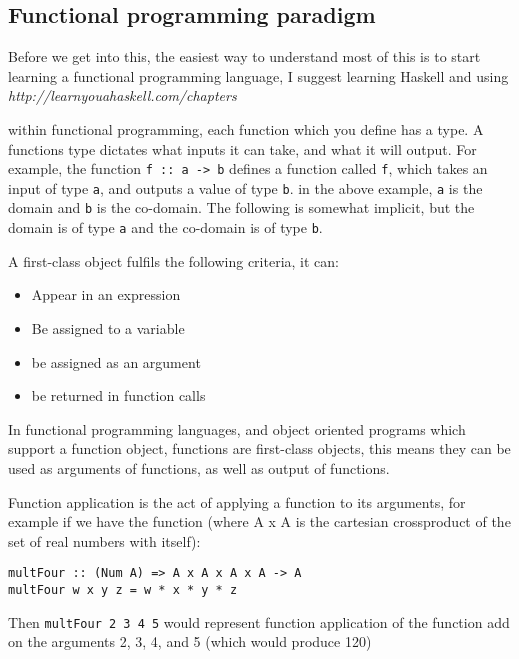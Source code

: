 \subsection{Functional programming paradigm}

  Before we get into this, the easiest way to understand most of this is to start learning a functional programming language, I suggest learning Haskell and using \textit{http://learnyouahaskell.com/chapters}

  \noindent
  within functional programming, each function which you define has a type. A functions type dictates what inputs it can take, and what it will output. For example, the function \verb|f :: a -> b| defines a function called \verb|f|, which takes an input of type \verb|a|, and outputs a value of type \verb|b|. in the above example, \verb|a| is the domain and \verb|b| is the co-domain. The following is somewhat implicit, but the domain is of type \verb|a| and the co-domain is of type \verb|b|. 

  \noindent
  A first-class object fulfils the following criteria, it can:
  \begin{itemize}
  	\item Appear in an expression
  	\item Be assigned to a variable
  	\item be assigned as an argument
  	\item be returned in function calls
  \end{itemize}
  
  In functional programming languages, and object oriented programs which support a function object, functions are first-class objects, this means they can be used as arguments of functions, as well as output of functions.

  \noindent
  Function application is the act of applying a function to its arguments, for example if we have the function (where A x A is the cartesian crossproduct of the set of real numbers with itself):
  \begin{verbatim}multFour :: (Num A) => A x A x A x A -> A
multFour w x y z = w * x * y * z\end{verbatim}
  Then \verb|multFour 2 3 4 5| would represent function application of the function add on the arguments 2, 3, 4, and 5 (which would produce 120)

